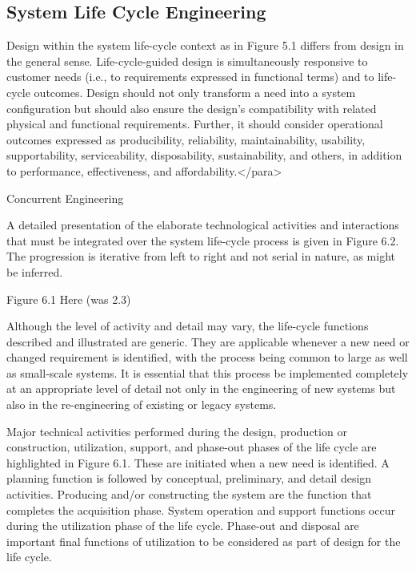 \subsection{System Life Cycle Engineering}

Design within the system life-cycle context as in Figure 5.1 differs from design in the general sense. Life-cycle-guided design is simultaneously responsive to customer needs (i.e., to requirements expressed in functional terms) and to life-cycle outcomes. Design should not only transform a need into a system configuration but should also ensure the design’s compatibility with related physical and functional requirements. Further, it should consider operational outcomes expressed as producibility, reliability, maintainability, usability, supportability, serviceability, disposability, sustainability, and others, in addition to performance, effectiveness, and affordability.</para>

Concurrent Engineering

A detailed presentation of the elaborate technological activities and interactions that must be integrated over the system life-cycle process is given in Figure 6.2. The progression is iterative from left to right and not serial in nature, as might be inferred.

Figure 6.1 Here (was 2.3)

Although the level of activity and detail may vary, the life-cycle functions described and illustrated are generic. They are applicable whenever a new need or changed requirement is identified, with the process being common to large as well as small-scale systems. It is essential that this process be implemented completely at an appropriate level of detail not only in the engineering of new systems but also in the re-engineering of existing or legacy systems.

Major technical activities performed during the design, production or construction, utilization, support, and phase-out phases of the life cycle are highlighted in Figure 6.1. These are initiated when a new need is identified. A planning function is followed by conceptual, preliminary, and detail design activities. Producing and/or constructing the system are the function that completes the acquisition phase. System operation and support functions occur during the utilization phase of the life cycle. Phase-out and disposal are important final functions of utilization to be considered as part of design for the life cycle.

